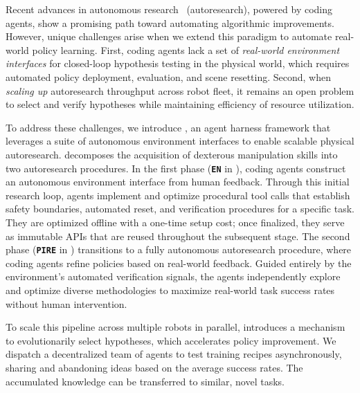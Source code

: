 Recent advances in autonomous research~\citep{karpathy2025autoresearch} (autoresearch), powered by coding agents, show a promising path toward automating algorithmic improvements. However, unique challenges arise when we extend this paradigm to automate real-world policy learning. First, coding agents lack a set of \emph{real-world environment interfaces} for closed-loop hypothesis testing in the physical world, which requires automated policy deployment, evaluation, and scene resetting. Second, when \emph{scaling up} autoresearch throughput across robot fleet, it remains an open problem to select and verify hypotheses while maintaining efficiency of resource utilization. 

To address these challenges, we introduce \method, an agent harness framework that leverages a suite of autonomous environment interfaces to enable scalable physical autoresearch. \method decomposes the acquisition of dexterous manipulation skills into two autoresearch procedures. In the first phase (\textbf{\texttt{{EN}}} in \method), coding agents construct an autonomous environment interface from human feedback. Through this initial research loop, agents implement and optimize procedural tool calls that establish safety boundaries, automated reset, and verification procedures for a specific task. They are optimized offline with a one-time setup cost; once finalized, they serve as immutable APIs that are reused throughout the subsequent stage. The second phase (\textbf{\texttt{{PIRE}}} in \method) transitions to a fully autonomous autoresearch procedure, where coding agents refine policies based on real-world feedback. Guided entirely by the environment's automated verification signals, the agents independently explore and optimize diverse methodologies to maximize real-world task success rates without human intervention. 

To scale this pipeline across multiple robots in parallel, \method introduces a mechanism to evolutionarily select hypotheses, which accelerates policy improvement. We dispatch a decentralized team of agents to test training recipes asynchronously, sharing and abandoning ideas based on the average success rates. The accumulated knowledge can be transferred to similar, novel tasks. 

